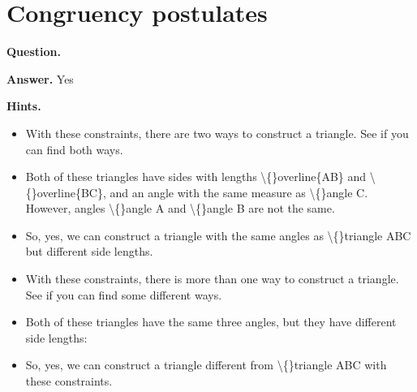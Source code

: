 \documentclass{article}
\begin{document}
\section*{Congruency postulates}
\textbf{Question.} 

\textbf{Answer.} Yes

\textbf{Hints.}
\begin{itemize}
  \item With these constraints, there are two ways to construct a triangle. See if you can find both ways.
  \item Both of these triangles have sides with lengths \textbackslash\{\}overline\{AB\} and \textbackslash\{\}overline\{BC\},
                            and an angle with the same measure as \textbackslash\{\}angle C.
                            However, angles \textbackslash\{\}angle A and \textbackslash\{\}angle B are not the same.
  \item So, yes, we can construct a triangle with the same angles as \textbackslash\{\}triangle ABC but different side lengths.
  \item With these constraints, there is more than one way to construct a triangle. See if you can find some different ways.
  \item Both of these triangles have the same three angles, but they have different side lengths:
  \item So, yes, we can construct a triangle different from \textbackslash\{\}triangle ABC with these constraints.
\end{itemize}
\end{document}
